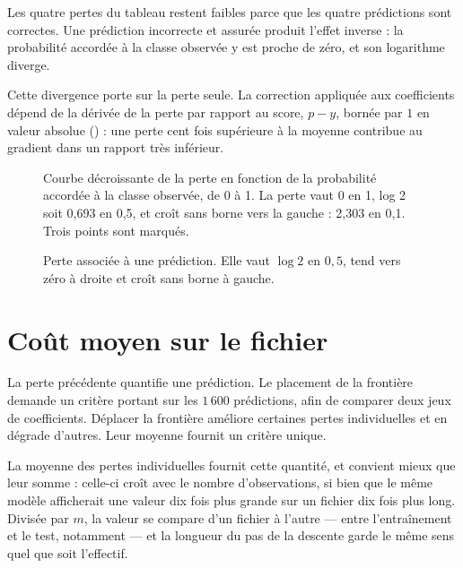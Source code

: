 Les quatre pertes du tableau restent faibles parce que les quatre prédictions
sont correctes. Une prédiction incorrecte et assurée produit l'effet inverse : la
probabilité accordée à la classe observée y est proche de zéro, et son logarithme
diverge.

Cette divergence porte sur la perte seule. La correction appliquée aux
coefficients dépend de la dérivée de la perte par rapport au score, $p-y$, bornée
par $1$ en valeur absolue () : une perte cent fois
supérieure à la moyenne contribue au gradient dans un rapport très inférieur.

\begin{figure}[htbp]
\centering
\begin{graphique}{Courbe décroissante de la perte en fonction de la probabilité accordée à la classe observée, de 0 à 1. La perte vaut 0 en 1, log 2 soit 0,693 en 0,5, et croît sans borne vers la gauche : 2,303 en 0,1. Trois points sont marqués.}
\end{graphique}
\caption{Perte associée à une prédiction. Elle vaut $\log 2$ en $0{,}5$, tend vers
zéro à droite et croît sans borne à gauche.}
\label{fig:cout-un}
\end{figure}
\FloatBarrier

\section{Coût moyen sur le fichier}

La perte précédente quantifie une prédiction. Le placement de la frontière
demande un critère portant sur les $1\,600$ prédictions, afin de comparer deux
jeux de coefficients. Déplacer la frontière améliore certaines pertes
individuelles et en dégrade d'autres. Leur moyenne fournit un critère unique.

La moyenne des pertes individuelles fournit cette quantité, et convient mieux que
leur somme : celle-ci croît avec le nombre d'observations, si bien que le même
modèle afficherait une valeur dix fois plus grande sur un fichier dix fois plus
long. Divisée par $m$, la valeur se compare d'un fichier à l'autre --- entre
l'entraînement et le test, notamment --- et la longueur du pas de la descente
garde le même sens quel que soit l'effectif.

